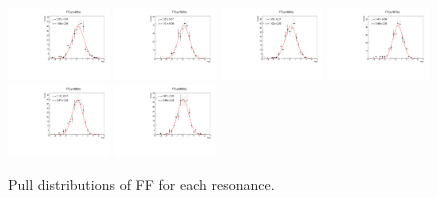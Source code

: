 \begin{figure}[h]
    \includegraphics[width=0.24\textwidth]{figure/io/fitfrac/pull_fitfrac_res7_comb.pdf}
    \includegraphics[width=0.24\textwidth]{figure/io/fitfrac/pull_fitfrac_res8_comb.pdf}
    \includegraphics[width=0.24\textwidth]{figure/io/fitfrac/pull_fitfrac_res9_comb.pdf}
    \includegraphics[width=0.24\textwidth]{figure/io/fitfrac/pull_fitfrac_res10_comb.pdf}
    \includegraphics[width=0.24\textwidth]{figure/io/fitfrac/pull_fitfrac_res11_comb.pdf}
    \includegraphics[width=0.24\textwidth]{figure/io/fitfrac/pull_fitfrac_res12_comb.pdf}
    \caption{Pull distributions of FF for each resonance.}
\label{fig:io_pull_ff}
\end{figure}

